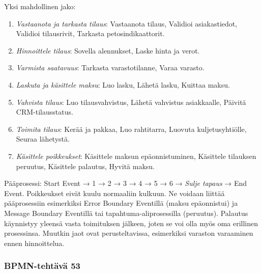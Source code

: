 \documentclass[
  finnish,
  letterpaper,
  DIV=11,
  numbers=noendperiod,
  oneside]{scrreprt}
\providecommand{\tightlist}{%
  \setlength{\itemsep}{0pt}\setlength{\parskip}{0pt}}
\begin{document}
\begin{tcolorbox}[enhanced jigsaw, arc=.35mm, bottomrule=.15mm, bottomtitle=1mm, breakable, colback=white, colbacktitle=quarto-callout-tip-color!10!white, colframe=quarto-callout-tip-color-frame, coltitle=black, left=2mm, leftrule=.75mm, opacityback=0, opacitybacktitle=0.6, rightrule=.15mm, title=\textcolor{quarto-callout-tip-color}{\faLightbulb}\hspace{0.5em}{Malliratkaisu}, titlerule=0mm, toprule=.15mm, toptitle=1mm]

Yksi mahdollinen jako:

\begin{enumerate}
\def\labelenumi{\arabic{enumi}.}
\tightlist
\item
  \emph{Vastaanota ja tarkasta tilaus}: Vastaanota tilaus, Validioi
  asiakastiedot, Validioi tilausrivit, Tarkasta petosindikaattorit.
\item
  \emph{Hinnoittele tilaus}: Sovella alennukset, Laske hinta ja verot.
\item
  \emph{Varmista saatavuus}: Tarkasta varastotilanne, Varaa varasto.
\item
  \emph{Laskuta ja käsittele maksu}: Luo lasku, Lähetä lasku, Kuittaa
  maksu.
\item
  \emph{Vahvista tilaus}: Luo tilausvahvistus, Lähetä vahvistus
  asiakkaalle, Päivitä CRM-tilausstatus.
\item
  \emph{Toimita tilaus}: Kerää ja pakkaa, Luo rahtitarra, Luovuta
  kuljetusyhtiölle, Seuraa lähetystä.
\item
  \emph{Käsittele poikkeukset}: Käsittele maksun epäonnistuminen,
  Käsittele tilauksen peruutus, Käsittele palautus, Hyvitä maksu.
\end{enumerate}

Pääprosessi: Start Event → 1 → 2 → 3 → 4 → 5 → 6 → \emph{Sulje tapaus} →
End Event. Poikkeukset eivät kuulu normaaliin kulkuun. Ne voidaan
liittää pääprosessiin esimerkiksi Error Boundary Eventillä (maksu
epäonnistui) ja Message Boundary Eventillä tai tapahtuma-aliprosessilla
(peruutus). Palautus käynnistyy yleensä vasta toimituksen jälkeen, joten
se voi olla myös oma erillinen prosessinsa. Muutkin jaot ovat
perusteltavissa, esimerkiksi varaston varaaminen ennen hinnoittelua.

\end{tcolorbox}

\subsubsection{BPMN-tehtävä 53}\label{bpmn-tehtuxe4vuxe4-53}
\end{document}
